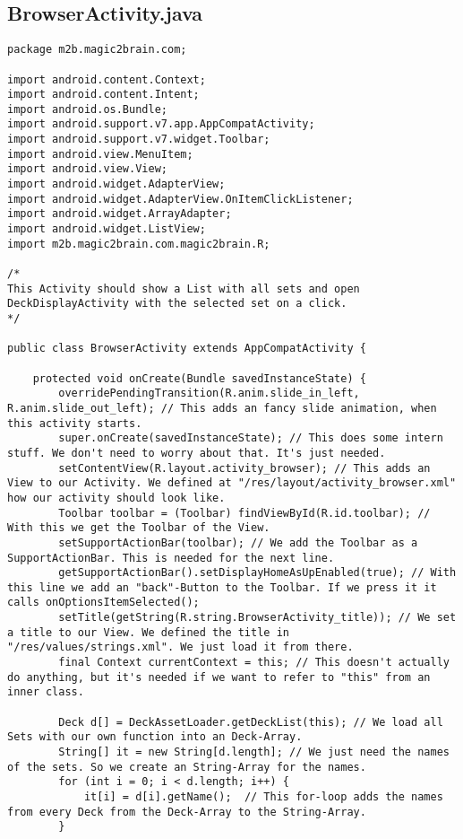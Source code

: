 \subsection{BrowserActivity.java}
\begin{lstlisting}
package m2b.magic2brain.com;

import android.content.Context;
import android.content.Intent;
import android.os.Bundle;
import android.support.v7.app.AppCompatActivity;
import android.support.v7.widget.Toolbar;
import android.view.MenuItem;
import android.view.View;
import android.widget.AdapterView;
import android.widget.AdapterView.OnItemClickListener;
import android.widget.ArrayAdapter;
import android.widget.ListView;
import m2b.magic2brain.com.magic2brain.R;

/*
This Activity should show a List with all sets and open DeckDisplayActivity with the selected set on a click.
*/

public class BrowserActivity extends AppCompatActivity {

    protected void onCreate(Bundle savedInstanceState) {
        overridePendingTransition(R.anim.slide_in_left, R.anim.slide_out_left); // This adds an fancy slide animation, when this activity starts.
        super.onCreate(savedInstanceState); // This does some intern stuff. We don't need to worry about that. It's just needed.
        setContentView(R.layout.activity_browser); // This adds an View to our Activity. We defined at "/res/layout/activity_browser.xml" how our activity should look like.
        Toolbar toolbar = (Toolbar) findViewById(R.id.toolbar); // With this we get the Toolbar of the View.
        setSupportActionBar(toolbar); // We add the Toolbar as a SupportActionBar. This is needed for the next line.
        getSupportActionBar().setDisplayHomeAsUpEnabled(true); // With this line we add an "back"-Button to the Toolbar. If we press it it calls onOptionsItemSelected();
        setTitle(getString(R.string.BrowserActivity_title)); // We set a title to our View. We defined the title in "/res/values/strings.xml". We just load it from there.
        final Context currentContext = this; // This doesn't actually do anything, but it's needed if we want to refer to "this" from an inner class.

        Deck d[] = DeckAssetLoader.getDeckList(this); // We load all Sets with our own function into an Deck-Array.
        String[] it = new String[d.length]; // We just need the names of the sets. So we create an String-Array for the names.
        for (int i = 0; i < d.length; i++) {
            it[i] = d[i].getName();  // This for-loop adds the names from every Deck from the Deck-Array to the String-Array.
        }


\end{lstlisting}
